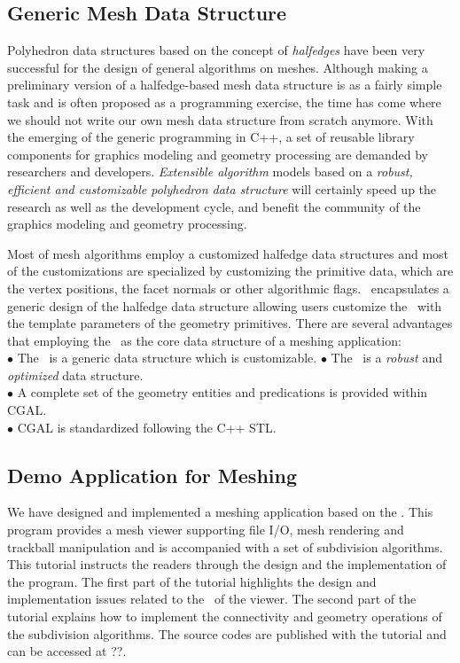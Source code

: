 \documentclass[letter]{article}
\begin{document}
\subsection*{Generic Mesh Data Structure}
Polyhedron data structures based on the concept of
\emph{halfedges} have been very successful for the design
of general algorithms on meshes. 
Although making a preliminary version of a halfedge-based mesh data
structure is as a fairly simple task and is often proposed as a
programming exercise, the time has come where we should not write our
own mesh data structure from scratch anymore. With the emerging of
the generic programming in C++, a set of reusable library
components for graphics modeling and geometry processing are demanded
by researchers and developers. \emph{Extensible algorithm} models based on
a \emph{robust, efficient and customizable polyhedron 
data structure} will certainly speed up
the research as well as the development cycle, and benefit the 
community of the graphics modeling and geometry processing.  

Most of mesh algorithms employ a customized 
halfedge data structures and most of the customizations 
are specialized by customizing the primitive data, 
which are the vertex positions, the facet normals or other 
algorithmic flags. \cgalpoly\ encapsulates a generic
design of the halfedge data structure allowing users
customize the \poly\ with the template parameters of
the geometry primitives. There are several advantages
that employing the \poly\ as the core data structure
of a meshing application: \\
\indent $\bullet$ The \poly\ is a generic data structure which 
is customizable.
\indent $\bullet$ The \poly\ is a \emph{robust} and \emph{optimized} 
data structure.\\
\indent $\bullet$ A complete set of the geometry entities and predications 
is provided within CGAL.\\
\indent $\bullet$ CGAL is standardized following the C++ STL.\\

\subsection*{Demo Application for Meshing}
We have designed and implemented a meshing application
based on the \cgalpoly . This program provides a
mesh viewer supporting file I/O, mesh rendering 
and trackball manipulation and is accompanied with a set of 
subdivision algorithms. This tutorial instructs
the readers through the design and the implementation of the 
program. The first part of the 
tutorial highlights the design and implementation issues 
related to the \poly\ of the viewer. The second part
of the tutorial explains how to implement 
the connectivity and geometry operations of the 
subdivision algorithms. The source codes are 
published with the tutorial and can be accessed at ??.
\end{document}
